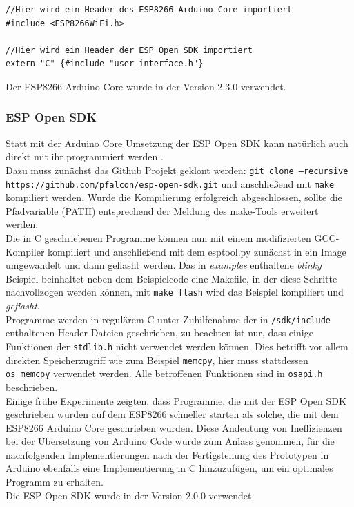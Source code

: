 \begin{verbatim}
//Hier wird ein Header des ESP8266 Arduino Core importiert
#include <ESP8266WiFi.h> 

//Hier wird ein Header der ESP Open SDK importiert
extern "C" {#include "user_interface.h"} 
\end{verbatim}

Der ESP8266 Arduino Core wurde in der Version 2.3.0 verwendet.

\subsubsection{ESP Open SDK}
Statt mit der Arduino Core Umsetzung der ESP Open SDK kann natürlich auch direkt mit ihr programmiert werden \cite{esp2017open}. \\
Dazu muss zunächst das Github Projekt geklont werden: \texttt{git clone --recursive \url{https://github.com/pfalcon/esp-open-sdk}.git} und anschließend mit \texttt{make} kompiliert werden.
Wurde die Kompilierung erfolgreich abgeschlossen, sollte die Pfadvariable (PATH) entsprechend der Meldung des make-Tools erweitert werden. \\
Die in C geschriebenen Programme können nun mit einem modifizierten GCC-Kompiler kompiliert und anschließend mit dem esptool.py zunächst in ein Image umgewandelt und dann geflasht werden. 
Das in \textit{examples} enthaltene \textit{blinky} Beispiel beinhaltet neben dem Beispielcode eine Makefile, in der diese Schritte nachvollzogen werden können, mit \texttt{make flash} wird das Beispiel kompiliert und \emph{geflasht}. \\
Programme werden in regulärem C unter Zuhilfenahme der in \texttt{/sdk/include} enthaltenen Header-Dateien geschrieben, zu beachten ist nur, dass einige Funktionen der \texttt{stdlib.h} nicht verwendet werden können.
Dies betrifft vor allem direkten Speicherzugriff wie zum Beispiel \texttt{memcpy}, hier muss stattdessen \texttt{os\_memcpy} verwendet werden.
Alle betroffenen Funktionen sind in \texttt{osapi.h} beschrieben. \\
Einige frühe Experimente zeigten, dass Programme, die mit der ESP Open SDK geschrieben wurden auf dem ESP8266 schneller starten als solche, die mit dem ESP8266 Arduino Core geschrieben wurden.
Diese Andeutung von Ineffizienzen bei der Übersetzung von Arduino Code wurde zum Anlass genommen, für die nachfolgenden Implementierungen nach der Fertigstellung des Prototypen in Arduino ebenfalls eine Implementierung in C hinzuzufügen, um ein optimales Programm zu erhalten. \\
Die ESP Open SDK wurde in der Version 2.0.0 verwendet.

